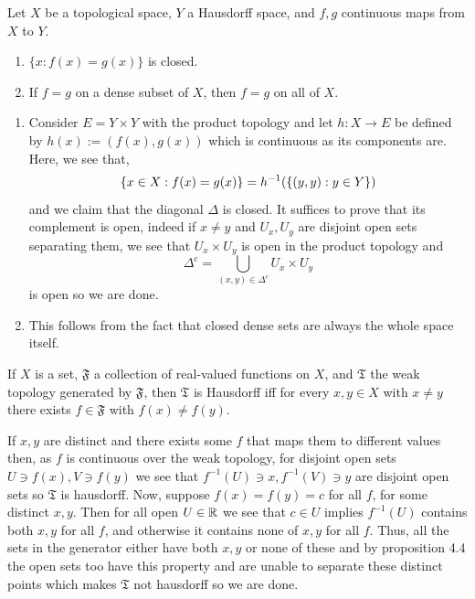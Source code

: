 \documentclass[12pt,a4paper]{article}
\begin{document}
\begin{problem}\label{prob:4-16}
Let $X$ be a topological space, $Y$ a Hausdorff space, and $f, g$ continuous maps from $X$ to $Y$.
\begin{enumerate}[label=\alph*.]
    \item $\{x : f(x) = g(x)\}$ is closed.
    \item If $f = g$ on a dense subset of $X$, then $f = g$ on all of $X$.
\end{enumerate}
\end{problem}
\begin{solution}
\begin{enumerate}[label=\alph*.]
    \item Consider $E=Y\times Y$ with the product topology and let $h:X\to E$ be defined by $h(x):=(f(x),g(x))$ which is continuous as its components are. 
        Here, we see that,
        \[
            \qty{x\in X : f(x) = g(x)} = h^{-1}( \qty{(y,y):y\in Y})
        \]
        and we claim that the diagonal $\Delta$ is closed. 
        It suffices to prove that its complement is open, indeed if $x\neq y$ and $U_x,U_y$ are disjoint open sets separating them, we see that $U_x\times U_y$ is open in the product topology and
        \[
            \Delta^c=\bigcup_{(x,y)\in\Delta^c}U_x\times U_y
        \]
        is open so we are done. 
    \item This follows from the fact that closed dense sets are always the whole space itself.
\end{enumerate}
\end{solution}
\begin{problem}\label{prob:4-17}
If $X$ is a set, $\mathfrak{F}$ a collection of real-valued functions on $X$, and $\mathfrak{T}$ the weak topology generated by $\mathfrak{F}$, then $\mathfrak{T}$ is Hausdorff iff for every $x, y \in X$ with $x \neq y$ there exists $f \in \mathfrak{F}$ with $f(x) \neq f(y)$.
\end{problem}
\begin{solution}
    If $x,y$ are distinct and there exists some $f$ that maps them to different values then, as $f$ is continuous over the weak topology, for disjoint open sets $U\ni f(x),V\ni f(y)$ we see that $f^{-1}(U)\ni x,f^{-1}(V)\ni y$ are disjoint open sets so $\mathfrak T$ is hausdorff. 
    Now, suppose $f(x)=f(y)=c$ for all $f$, for some  distinct $x,y$. 
    Then for all open $U\in\mathbb{R}$ we see that $c\in U$ implies $f^{-1}(U)$ contains both $x,y$ for all $f$, and otherwise it contains none of $x,y$ for all $f$. 
    Thus, all the sets in the generator either have both $x,y$ or none of these and by proposition 4.4 the open sets too have this property and are unable to separate these distinct points which makes $\mathfrak T$ not hausdorff so we are done. 
\end{solution}
\end{document}
